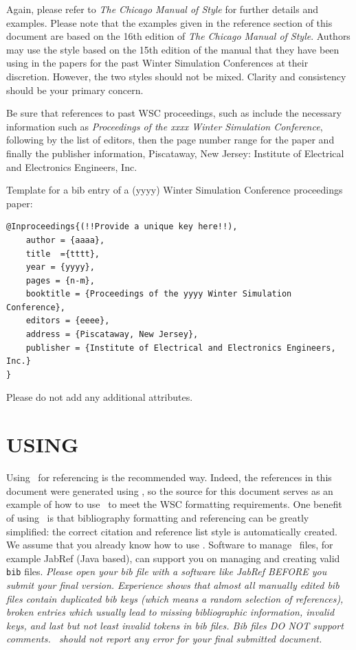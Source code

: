 \documentclass{wscpaperproc}
\theoremstyle{wsc}
\begin{document}
Again, please refer to {\it The Chicago Manual of Style} \cite{chicago03} for further details and examples.
Please note that the examples given in the reference section of this document are based on the 16th edition of {\it The Chicago Manual of Style}.
Authors may use the style based on the 15th edition of the manual that they have been using in the papers for the past Winter Simulation Conferences at their discretion.
However, the two styles should not be mixed.  Clarity and consistency should be your primary concern.

Be sure that references to past WSC proceedings, such as  include the necessary information such as {\it Proceedings of the xxxx Winter Simulation Conference}, following by the list of editors, then the page number range for the paper and finally the publisher information, Piscataway, New Jersey: Institute of Electrical and Electronics Engineers, Inc.

Template for a bib entry of a (yyyy) Winter Simulation Conference proceedings paper:\newline


\begin{verbatim}
@Inproceedings{(!!Provide a unique key here!!),
	author = {aaaa},
	title  ={tttt},
	year = {yyyy},
	pages = {n-m},
	booktitle = {Proceedings of the yyyy Winter Simulation Conference},
	editors = {eeee},
	address = {Piscataway, New Jersey},
	publisher = {Institute of Electrical and Electronics Engineers, Inc.}
}
\end{verbatim}\vspace{5mm}

Please do not add any additional attributes.

\section{USING \BibTeX}
\label{sec:bibtex}
Using \BibTeX\ for referencing is the recommended way. Indeed, the references in this document were generated using \BibTeX, so the source for this
document serves as an example of how to use \BibTeX\ to meet the WSC formatting requirements.
One benefit of using \BibTeX\ is that bibliography formatting and referencing can be greatly simplified: the correct citation and reference list style is automatically created.
We assume that you already know how to use \BibTeX.
Software to manage \BibTeX\ files, for example JabRef (Java based), can support you on managing and creating valid {\tt bib} files.
{\em Please open your bib file with a software like JabRef BEFORE you submit your final version. Experience shows that almost all manually edited bib files contain duplicated bib keys (which means a random selection of references), broken entries which usually lead to missing bibliographic information, invalid keys, and last but not least invalid tokens in bib files. Bib files DO NOT support comments. \BibTeX\ should not report any error for your final submitted document.}
\end{document}
